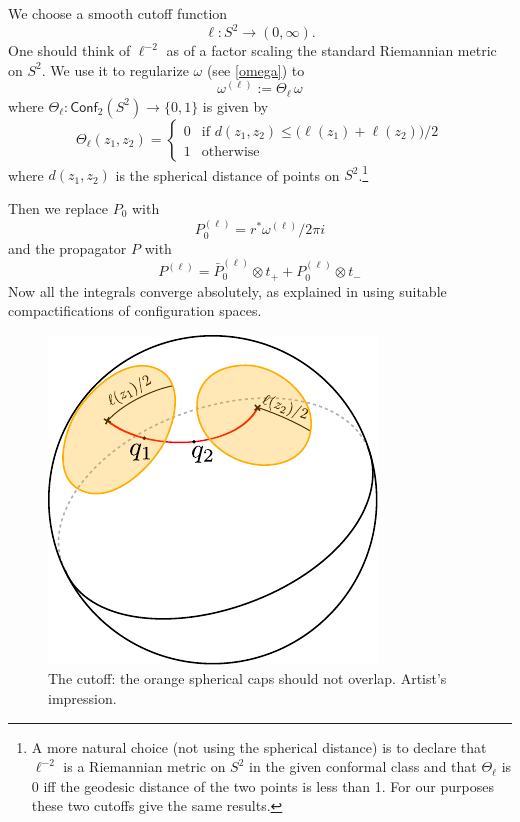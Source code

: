 \documentclass[a4paper]{amsart}
\theoremstyle{plain}
\theoremstyle{definition}
\newcommand{\cf}{\mathsf{Conf}}
\begin{document}
We choose a smooth cutoff function
$$\ell\colon S^2\to(0,\infty).$$ 
One should think of $\ell^{-2}$ as of a factor scaling the standard Riemannian metric on $S^2$. 
We use it to regularize $\omega$ (see \eqref{omega}) to
$$\omega^{(\ell)}:=\Theta_\ell\, \omega$$
where $\Theta_\ell\colon\cf_2(S^2)\to\{0,1\}$ is given by
$$
\Theta_\ell(z_1,z_2)=
\begin{cases}
0 & \text{if } d(z_1,z_2)\leq \bigl(\ell(z_1)+\ell(z_2)\bigr)/2\\
1 & \text{otherwise}
\end{cases}
$$
where $d(z_1,z_2)$ is the spherical distance of points on $S^2$.\footnote{%
A more natural choice (not using the spherical distance) is to declare that $\ell^{-2}$ is a Riemannian metric on $S^2$ in the given conformal class and that $\Theta_\ell$ is 0 iff the geodesic distance of the two points is less than 1. For our purposes these two cutoffs give the same results.}

%	



Then we replace $P_0$ with
$$P_0^{(\ell)}=r^*\omega^{(\ell)}/2\pi i$$
and the propagator $P$ with
$$P^{(\ell)}=\bar P_0^{(\ell)}\otimes t_+ +  P_0^{(\ell)}\otimes t_-$$
 Now all the integrals converge absolutely, as explained in \cite{AS,K} using suitable compactifications of configuration spaces.
 
\begin{figure}[h]
\includegraphics{cutoff}
	\caption{The cutoff: the orange spherical caps should not overlap. Artist's impression.}
\end{figure}
\end{document}
